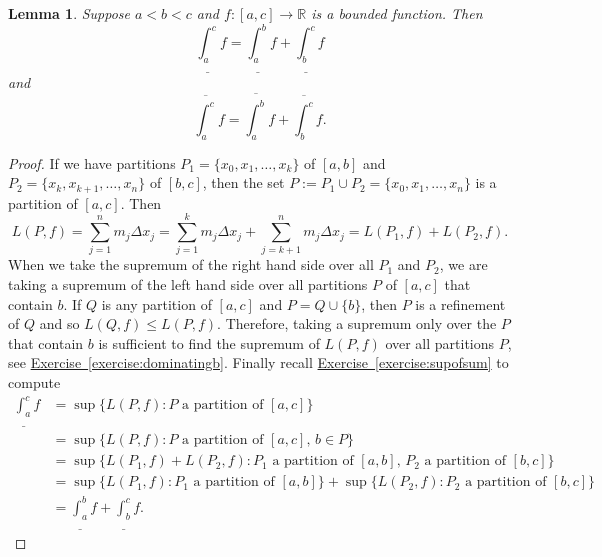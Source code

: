 \documentclass[12pt]{book}
\newcommand{\R}{{\mathbb{R}}}
\theoremstyle{plain}
\newtheorem{lemma}[thm]{Lemma}
\theoremstyle{remark}
\theoremstyle{definition}
\theoremstyle{exercise}
\theoremstyle{example}
\newcommand{\exerciseref}[1]{\hyperref[#1]{Exercise~\ref*{#1}}}
\begin{document}
\begin{lemma} \label{lemma:darbouxadd}
Suppose $a < b < c$ and $f \colon [a,c] \to \R$ is a bounded function.
Then
\begin{equation*}
\underline{\int_a^c} f
=
\underline{\int_a^b} f
+
\underline{\int_b^c} f
\end{equation*}
and
\begin{equation*}
\overline{\int_a^c} f
=
\overline{\int_a^b} f
+
\overline{\int_b^c} f .
\end{equation*}
\end{lemma}

\begin{proof}
If we have partitions $P_1 = \{ x_0,x_1,\ldots,x_k \}$
of $[a,b]$ and $P_2 = \{ x_k, x_{k+1}, \ldots, x_n \}$ of $[b,c]$,
then the set $P := P_1 \cup P_2 = \{ x_0, x_1, \ldots, x_n \}$ is
a partition of $[a,c]$.  Then
\begin{equation*}
L(P,f) =
\sum_{j=1}^n m_j \Delta x_j
=
\sum_{j=1}^k m_j \Delta x_j
+
\sum_{j=k+1}^n m_j \Delta x_j
=
L(P_1,f) + L(P_2,f) .
\end{equation*}
When we take the supremum of the right hand side over all $P_1$ and $P_2$,
we are taking a supremum of the left hand side
over all partitions $P$ of $[a,c]$ that contain $b$.  If $Q$ is any partition
of $[a,c]$ and $P = Q \cup \{ b \}$, then $P$ is a refinement of $Q$
and so $L(Q,f) \leq L(P,f)$.  Therefore, taking a supremum only over the $P$
that contain $b$ is sufficient to find the supremum of $L(P,f)$
over all partitions $P$, see \exerciseref{exercise:dominatingb}.
Finally recall \exerciseref{exercise:supofsum}
to compute
\begin{equation*}
\begin{split}
\underline{\int_a^c} f
& =
\sup \{ L(P,f) : \text{$P$ a partition of $[a,c]$} \}
\\
& =
\sup \{ L(P,f) : \text{$P$ a partition of $[a,c]$, $b \in P$} \}
\\
& =
\sup \{ L(P_1,f) + L(P_2,f) :
\text{$P_1$ a partition of $[a,b]$, $P_2$ a partition of $[b,c]$} \}
\\
& =
\sup \{ L(P_1,f) : \text{$P_1$ a partition of $[a,b]$} \}
+
\sup \{ L(P_2,f) : \text{$P_2$ a partition of $[b,c]$} \}
\\
&=
\underline{\int_a^b} f + \underline{\int_b^c} f .
\end{split}
\end{equation*}


\end{proof}
\end{document}
